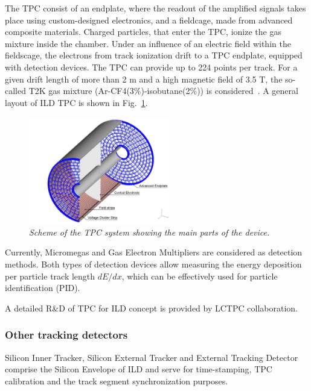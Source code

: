 The TPC consist of an endplate, where the readout of the amplified signals takes place using custom-designed electronics, and a fieldcage, made from advanced composite materials. 
Charged particles, that enter the TPC, ionize the gas mixture inside the chamber. Under an influence of an electric field within the fieldscage, the electrons from track ionization drift to a TPC endplate, equipped with detection devices. The TPC can provide up to 224 points per track.
For a given drift length of more than 2 m and a high magnetic field of 3.5 T, the so-called T2K gas mixture (Ar-CF4(3\%)-isobutane(2\%)) is considered~\cite{bib:ILC}.
A general layout of ILD TPC is shown in Fig.~\ref{fig:ILCtpc}. 
\begin{figure}
{\centering
    \includegraphics[width=0.55\textwidth]{graphics/ILCtpc.jpg}
    \caption{\sl Scheme of the TPC system showing the main parts of the device.}
    \label{fig:ILCtpc}
  }
\end{figure}	

Currently, Micromegas and Gas Electron Multipliers are considered as detection methods. Both types of detection devices allow measuring the energy deposition per particle track length $dE/dx$, which can be effectively used for particle identification (PID).

A detailed R\&D of TPC for ILD concept is provided by LCTPC collaboration.

\subsubsection{Other tracking detectors}
Silicon Inner Tracker, Silicon External Tracker and External Tracking Detector comprise the Silicon Envelope of ILD and serve for time-stamping, TPC calibration and the track segment synchronization purposes. 


